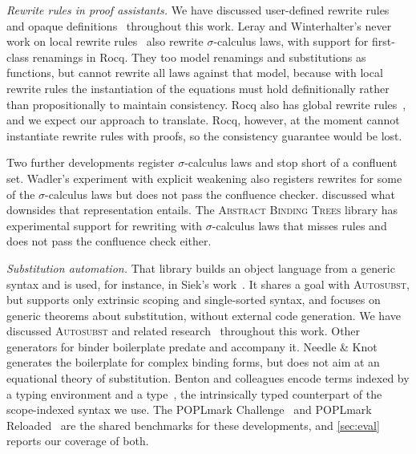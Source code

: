 \documentclass[sigplan,anonymous,review]{acmart}
\theoremstyle{acmdefinition}
\begin{document}
\emph{Rewrite rules in proof assistants.} We have discussed user-defined
rewrite rules~\cite{10.1145/3434341, cockx:LIPIcs.TYPES.2019.2,
  leray_et_al:LIPIcs.ITP.2024.26} and opaque
definitions~\cite{gratzer2022controlling} throughout this work. Leray and
Winterhalter's never work on local rewrite rules~\cite{10.1145/3776704} also
rewrite $σ$-calculus laws, with support for first-class renamings in Rocq.
They too model renamings and substitutions as functions, but cannot rewrite
all laws against that model, because with local rewrite rules the
instantiation of the equations must hold definitionally rather than
propositionally to maintain consistency. Rocq also has global rewrite
rules~\cite{leray_et_al:LIPIcs.ITP.2024.26}, and we expect our approach to
translate. Rocq, however, at the moment cannot instantiate rewrite rules with
proofs, so the consistency guarantee would be lost.

Two further developments register $σ$-calculus laws and stop short of a
confluent set. Wadler's experiment with explicit weakening also registers
rewrites for some of the $σ$-calculus laws but does not pass the confluence
checker.  discussed what downsides that representation
entails. The \textsc{Abstract Binding Trees} library has experimental support
for rewriting with $σ$-calculus laws that misses rules and does not pass the
confluence check either.

\emph{Substitution automation.} That library builds an object language from a
generic syntax and is used, for instance, in Siek's
work~\cite{siek2021parameterized}. It shares a goal with \textsc{Autosubst},
but supports only extrinsic scoping and single-sorted syntax, and focuses on
generic theorems about substitution, without external code generation. We have
discussed \textsc{Autosubst} and related
research~\cite{10.1145/3293880.3294101, schafer2015autosubst,
  Stark:2020:Mechanising} throughout this work. Other generators for binder
boilerplate predate and accompany it. Needle \&
Knot~\cite{10.1007/978-3-662-49498-1_17} generates the boilerplate for complex
binding forms, but does not aim at an equational theory of substitution.
Benton and colleagues encode terms indexed by a typing environment and a
type~\cite{stronglytyped}, the intrinsically typed counterpart of the
scope-indexed syntax we use. The POPLmark Challenge~\cite{poplmark2005} and
POPLmark Reloaded~\cite{poplmarkreloaded2019} are the shared benchmarks for
these developments, and \cref{sec:eval} reports our coverage of both.
\end{document}
